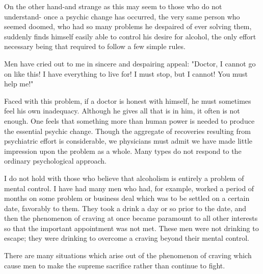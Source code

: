 \begin{biblechapter}
\verse On the other hand-and 
    strange as this may seem to those who do not understand-
    once a psychic change has occurred, 
    the very same person who seemed doomed, 
    who had so many problems he despaired of ever solving them, 
    suddenly finds himself easily able to control his desire for alcohol, 
    the only effort necessary being that required 
    to follow a few simple rules.

\verse Men have cried out to me in sincere and despairing appeal: 
\verse "Doctor, I cannot go on like this! 
    I have everything to live for! 
    I must stop, but I cannot! 
    You must help me!"

\verse Faced with this problem, 
    if a doctor is honest with himself, 
    he must sometimes feel his own inadequacy. 
\verse Although he gives all that is in him, it often is not enough. 
\verse One feels that something more than human power is needed 
    to produce the essential psychic change. 
\verse Though the aggregate of recoveries 
    resulting from psychiatric effort is considerable, 
    we physicians must admit 
    we have made little impression upon the problem as a whole. 
\verse Many types do not respond to the ordinary psychological approach.
\end{biblechapter}


\begin{biblechapter}
    I do not hold with those 
    who believe that alcoholism is entirely a problem of mental control.
\verse I have had many men who had, for example, 
    worked a period of months on some problem 
    or business deal which was to be settled on a certain date, 
    favorably to them. 
\verse They took a drink a day or so prior to the date, 
    and then the phenomenon of craving 
    at once became paramount to all other interests 
    so that the important appointment was not met. 
\verse These men were not drinking to escape; 
    they were drinking to overcome a craving beyond their mental control.

\verse There are many situations which arise 
    out of the phenomenon of craving 
    which cause men to make the supreme sacrifice 
    rather than continue to fight.
\end{biblechapter}


